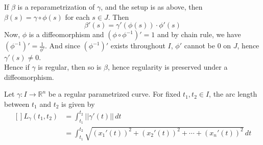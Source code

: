 \begin{observe}[]
    If $\beta$ is a reparametrization of $\gamma$, and the setup is as above, then $\beta(s)=\gamma\circ\phi(s)$ for each $s\in J$. Then $$\beta'(s)=\gamma'(\phi(s))\cdot\phi'(s)$$
    Now, $\phi$ is a diffeomorphism and $(\phi\circ\phi^{-1})' = 1$ and by chain rule, we have $(\phi^{-1})'=\frac{1}{\phi'}$. And since $(\phi^{-1})'$ exists throughout $I$, $\phi'$ cannot be $0$ on $J$, hence $\gamma'(s)\neq0$.\\ 
    Hence if $\gamma$ is regular, then so is $\beta$, hence regularity is preserved under a diffeomorphism.
\end{observe}
\vspace{0.4cm}
\begin{definition}
    Let $\gamma:I\to\mathbb{R}^{n}$ be a regular parametrized curve. For fixed $t_1,t_2\in I$, the arc length between $t_{1}$ and $t_{2}$ is given by $$\begin{aligned}[]
        L_{\gamma}(t_1,t_2)&=\int_{t_1}^{t_2}||\gamma'(t)||\,dt\\
                           &=\int_{t_1}^{t_2}\sqrt{(x_1'(t))^{2}+(x_2'(t))^{2}+\cdots+(x_n'(t))^{2}}\,dt
    \end{aligned}
    $$
\end{definition}
\vspace{0.4cm}
